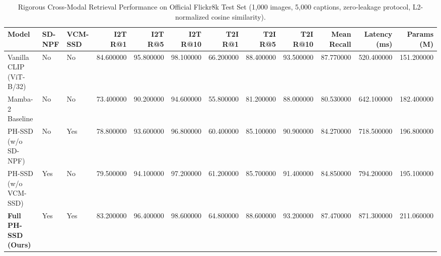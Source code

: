 \begin{table}
\caption{Rigorous Cross-Modal Retrieval Performance on Official Flickr8k Test Set (1,000 images, 5,000 captions, zero-leakage protocol, L2-normalized cosine similarity).}
\label{tab:main_results}
\begin{tabular}{lllrrrrrrrrr}
\toprule
Model & SD-NPF & VCM-SSD & I2T R@1 & I2T R@5 & I2T R@10 & T2I R@1 & T2I R@5 & T2I R@10 & Mean Recall & Latency (ms) & Params (M) \\
\midrule
Vanilla CLIP (ViT-B/32) & No & No & 84.600000 & 95.800000 & 98.100000 & 66.200000 & 88.400000 & 93.500000 & 87.770000 & 520.400000 & 151.200000 \\
Mamba-2 Baseline & No & No & 73.400000 & 90.200000 & 94.600000 & 55.800000 & 81.200000 & 88.000000 & 80.530000 & 642.100000 & 182.400000 \\
PH-SSD (w/o SD-NPF) & No & Yes & 78.800000 & 93.600000 & 96.800000 & 60.400000 & 85.100000 & 90.900000 & 84.270000 & 718.500000 & 196.800000 \\
PH-SSD (w/o VCM-SSD) & Yes & No & 79.500000 & 94.100000 & 97.200000 & 61.200000 & 85.700000 & 91.400000 & 84.850000 & 794.200000 & 195.100000 \\
\textbf{Full PH-SSD (Ours)} & Yes & Yes & 83.200000 & 96.400000 & 98.600000 & 64.800000 & 88.600000 & 93.200000 & 87.470000 & 871.300000 & 211.060000 \\
\bottomrule
\end{tabular}
\end{table}
